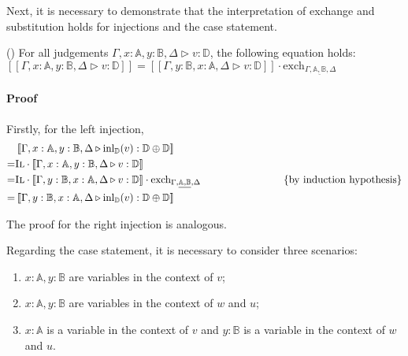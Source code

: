 Next, it is necessary to demonstrate that the interpretation of exchange and substitution holds for injections and the case statement.

\begin{lemma} \label{interpret_exch} () For all judgements $\Gamma,x:\mathbb{A}, y:\mathbb{B}, \Delta \triangleright v: \mathbb{D}$, the following equation holds: $[\![\Gamma,x:\mathbb{A}, y:\mathbb{B}, \Delta \triangleright v: \mathbb{D}]\!] = [\![\Gamma,y:\mathbb{B},x:\mathbb{A},  \Delta \triangleright v: \mathbb{D}]\! ] \cdot \text{exch}_{\Gamma, \underline{ \mathbb{A}, \mathbb{B}} ,\Delta} $ 
\end{lemma}

\paragraph{Proof}
Firstly, for the left injection,
\begin{equation*}
  \begin{split}
    & \hspace{2pt} [\![\Gamma, x:\mathbb{A}, y:\mathbb{B},  \Delta \triangleright \text{inl}_{\mathbb{D}}(v):  \mathbb{D} \oplus \mathbb{D}]\!] \\
    = & \textsc{Il} \cdot [\![\Gamma, x:\mathbb{A}, y:\mathbb{B},  \Delta \triangleright v: \mathbb{D}]\!] \\
    = & \textsc{Il} \cdot [\![\Gamma,y:\mathbb{B},  x:\mathbb{A},  \Delta \triangleright v: \mathbb{D}]\!] \cdot \text{exch}_{\Gamma, \underline{ \mathbb{A}, \mathbb{B}} ,\Delta} \hspace{80pt} \{\text{by induction hypothesis}\}\\ 
    = &\hspace{2pt} [\![\Gamma,y:\mathbb{B}, x:\mathbb{A},   \Delta \triangleright \text{inl}_{\mathbb{D}}(v):  \mathbb{D} \oplus \mathbb{D}]\!]
  \end{split}
\end{equation*}

The proof for the right injection is analogous.

Regarding the case statement, it is necessary to consider three scenarios:
\begin{enumerate}
  \item $x:\mathbb{A}, y:\mathbb{B}$ are variables in the context of $v$;
  \item $x:\mathbb{A}, y:\mathbb{B}$ are variables in the context of $w$ and $u$;
  \item  $x:\mathbb{A}$ is a variable in the context of $v$ and $y:\mathbb{B}$ is a variable in the context of $w$ and $u$.
\end{enumerate}

